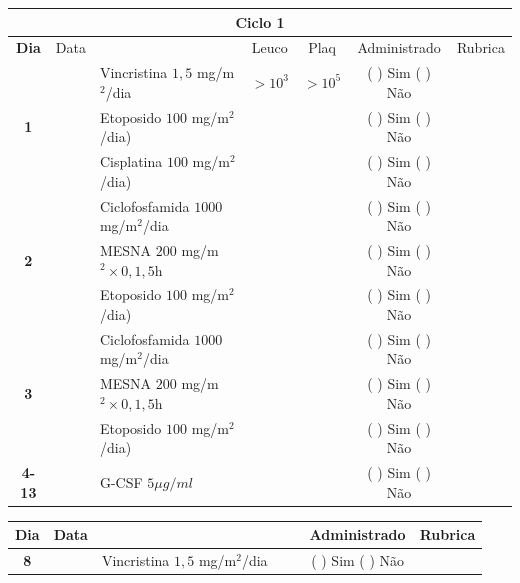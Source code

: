 \documentclass[11pt,a4paper,oldfontcommands]{memoir}
\begin{document}
\begin{center}
\begin{table}[H] \small
\begin{tabular}{p{1cm}c|p{5cm}|p{1.5cm}p{1.5cm}|c|c}
	\hline
	\multicolumn{7}{c}{Ciclo 1} \\
	\hline
	\multicolumn{1}{c|}{\multirow{1}{*}{\textbf{Dia}}}&{Data}&{}&\multicolumn{1}{c|}{Leuco}&\multicolumn{1}{c|}{Plaq}&{Administrado}&{Rubrica} \\
    \hline
    \multicolumn{1}{c|}{\multirow{3}{*}{\textbf{1}}}&&{Vincristina \(1,5\) mg/m\(^2\)/dia}&\multicolumn{1}{c|}{\(>10^3\)}&\multicolumn{1}{c|}{\(>10^5\)}&{(  ) Sim (  ) Não}&\\
    \cline{4-5}
    \multicolumn{1}{c|}{}&&{Etoposido \(100\) mg/m\(^2\)/dia)}&&&{(  ) Sim (  ) Não}&\\
    \cline{4-5}
    \multicolumn{1}{c|}{}&\multirow{1}{*}{}&{Cisplatina \(100\) mg/m\(^2\)/dia)}&&&{(  ) Sim (  ) Não}&\\
    \hline
    \multicolumn{1}{c|}{\multirow{3}{*}{\textbf{2}}}&&{Ciclofosfamida \(1000\) mg/m\(^2\)/dia}&{}&&{(  ) Sim (  ) Não}&\\
    \multicolumn{1}{c|}{}&&{MESNA \(200\) mg/m\(^2 \times 0,1,5\)h}&&&{(  ) Sim (  ) Não}&\\
    \multicolumn{1}{c|}{}&&{Etoposido \(100\) mg/m\(^2\)/dia)}&&&{(  ) Sim (  ) Não}&\\
    \hline
    \multicolumn{1}{c|}{\multirow{3}{*}{\textbf{3}}}&&{Ciclofosfamida \(1000\) mg/m\(^2\)/dia}&{}&&{(  ) Sim (  ) Não}&\\
    \multicolumn{1}{c|}{}&&{MESNA \(200\) mg/m\(^2 \times 0,1,5\)h}&&&{(  ) Sim (  ) Não}&\\
    \multicolumn{1}{c|}{}&\multirow{1}{*}{}&{Etoposido \(100\) mg/m\(^2\)/dia)}&{}&&{(  ) Sim (  ) Não}&\\
    \hline
    \multicolumn{1}{c|}{\textbf{4-13}}&&{G-CSF \(5 \mu g/ml\) }&&&{(  ) Sim (  ) Não}&\\
    \hline
\end{tabular}
\end{table}
\begin{table}[H]
\begin{tabular}{p{1cm}c|p{4cm}|p{2cm}p{2cm}|c|c}
	\hline
	\multicolumn{1}{c|}{\multirow{1}{*}{\textbf{Dia}}}&{Data}&{}&{}&&{Administrado}&{Rubrica} \\
    \hline
    \multicolumn{1}{c|}{\textbf{8}}&&{Vincristina \(1,5\) mg/m\(^2\)/dia}&\multicolumn{1}{c}{}&&{(  ) Sim (  ) Não}&\\

\end{tabular}
\end{table}
\end{center}
\end{document}
